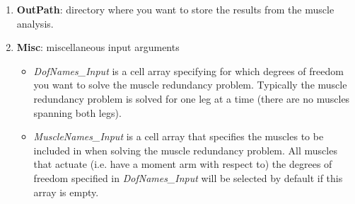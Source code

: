 \documentclass[a4paper,oneside,11pt]{article}
\begin{document}
\begin{enumerate}
	\item \textbf{OutPath}: directory where you want to store the results from the muscle analysis.
	\item \textbf{Misc}: miscellaneous input arguments
	\begin{itemize}
		\item \textit{DofNames_Input}  is a cell array specifying for which degrees of freedom you want to solve the muscle redundancy problem. Typically the muscle redundancy problem is solved for one leg at a time (there are no muscles spanning both legs).
		\item \textit{MuscleNames_Input} is a cell array that specifies the muscles to be included in when solving the muscle redundancy problem. All muscles that actuate (i.e. have a moment arm with respect to) the degrees of freedom specified in \textit{DofNames_Input} will be selected by default if this array is empty.
	\end{itemize}
\end{enumerate}
\end{document}
